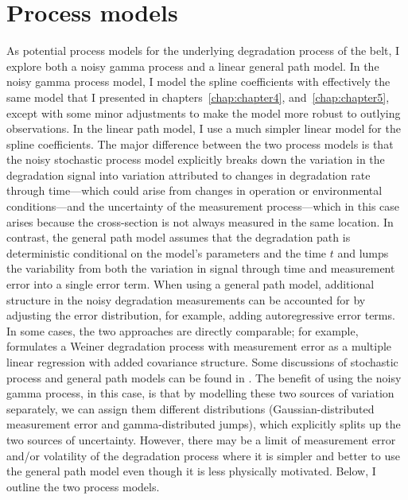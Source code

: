 \section{Process models}
As potential process models for the underlying degradation process of the belt, I explore both a noisy gamma process and a linear general path model. In the noisy gamma process model, I model the spline coefficients with effectively the same model that I presented in chapters~\ref{chap:chapter4}, and~\ref{chap:chapter5}, except with some minor adjustments to make the model more robust to outlying observations. In the linear path model, I use a much simpler linear model for the spline coefficients. The major difference between the two process models is that the noisy stochastic process model explicitly breaks down the variation in the degradation signal into variation attributed to changes in degradation rate through time---which could arise from changes in operation or environmental conditions---and the uncertainty of the measurement process---which in this case arises because the cross-section is not always measured in the same location. In contrast, the general path model assumes that the degradation path is deterministic conditional on the model's parameters and the time $t$ and lumps the variability from both the variation in signal through time and measurement error into a single error term. When using a general path model, additional structure in the noisy degradation measurements can be accounted for by adjusting the error distribution, for example, adding autoregressive error terms. In some cases, the two approaches are directly comparable; for example, \citet{whitmore_1995} formulates a Weiner degradation process with measurement error as a multiple linear regression with added covariance structure. Some discussions of stochastic process and general path models can be found in \citet{ye2015}. The benefit of using the noisy gamma process, in this case, is that by modelling these two sources of variation separately, we can assign them different distributions (Gaussian-distributed measurement error and gamma-distributed jumps), which explicitly splits up the two sources of uncertainty. However, there may be a limit of measurement error and/or volatility of the degradation process where it is simpler and better to use the general path model even though it is less physically motivated. Below, I outline the two process models.

